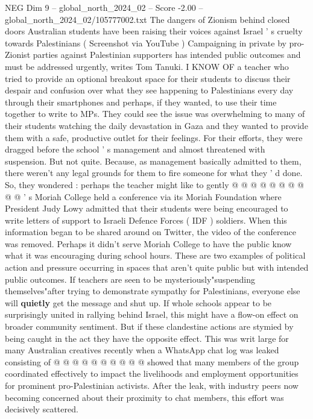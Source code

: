 \begin{textsample}{NEG Dim 9 – global\_north\_2024\_02 – Score -2.00 – global\_north\_2024\_02/105777002.txt}  \label{ex:f9_neg_237}
The dangers of Zionism behind closed doors Australian students have been raising their voices against Israel ' s cruelty towards Palestinians ( Screenshot via YouTube ) Campaigning in private by pro-Zionist parties against Palestinian supporters has intended public outcomes and must be addressed urgently, writes Tom Tanuki.
I KNOW OF a teacher who tried to provide an optional breakout space for their students to discuss their despair and confusion over what they see happening to Palestinians every day through their smartphones and perhaps, if they wanted, to use their time together to write to MPs.
They could see the issue was overwhelming to many of their students watching the daily devastation in Gaza and they wanted to provide them with a safe, productive outlet for their feelings.
For their efforts, they were dragged before the school ' s management and almost threatened with suspension.
But not quite.
Because, as management basically admitted to them, there weren't any legal grounds for them to fire someone for what they ' d done.
So, they wondered : perhaps the teacher might like to gently @ @ @ @ @ @ @ @ @ @ ' s Moriah College held a conference via its Moriah Foundation where President Judy Lowy admitted that their students were being encouraged to write letters of support to Israeli Defence Forces ( IDF ) soldiers.
When this information began to be shared around on Twitter, the video of the conference was removed.
Perhaps it didn't serve Moriah College to have the public know what it was encouraging during school hours.
These are two examples of political action and pressure occurring in spaces that aren't quite public but with intended public outcomes.
If teachers are seen to be mysteriously"suspending themselves"after trying to demonstrate sympathy for Palestinians, everyone else will \textbf{quietly} get the message and shut up.
If whole schools appear to be surprisingly united in rallying behind Israel, this might have a flow-on effect on broader community sentiment.
But if these clandestine actions are stymied by being caught in the act they have the opposite effect.
This was writ large for many Australian creatives recently when a WhatsApp chat log was leaked consisting of @ @ @ @ @ @ @ @ @ @ showed that many members of the group coordinated effectively to impact the livelihoods and employment opportunities for prominent pro-Palestinian activists.
After the leak, with industry peers now becoming concerned about their proximity to chat members, this effort was decisively scattered.

\end{textsample}
